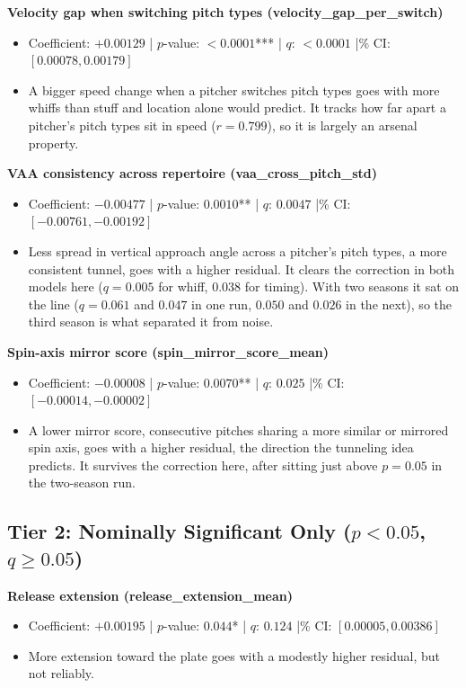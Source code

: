 \documentclass[11pt]{article}
\newcommand{\feat}[1]{\textbf{#1}}
\begin{document}
\feat{Velocity gap when switching pitch types (velocity\_gap\_per\_switch)}
\begin{itemize}
\item Coefficient: $+0.00129$ \;|\; $p$-value: $<0.0001$*** \;|\; $q$: $<0.0001$ \;|\% CI: $[0.00078, 0.00179]$
\item A bigger speed change when a pitcher switches pitch types goes with more whiffs than stuff and location alone would predict. It tracks how far apart a pitcher's pitch types sit in speed ($r=0.799$), so it is largely an arsenal property.
\end{itemize}

\feat{VAA consistency across repertoire (vaa\_cross\_pitch\_std)}
\begin{itemize}
\item Coefficient: $-0.00477$ \;|\; $p$-value: $0.0010$** \;|\; $q$: $0.0047$ \;|\% CI: $[-0.00761, -0.00192]$
\item Less spread in vertical approach angle across a pitcher's pitch types, a more consistent tunnel, goes with a higher residual. It clears the correction in both models here ($q=0.005$ for whiff, $0.038$ for timing). With two seasons it sat on the line ($q=0.061$ and $0.047$ in one run, $0.050$ and $0.026$ in the next), so the third season is what separated it from noise.
\end{itemize}

\feat{Spin-axis mirror score (spin\_mirror\_score\_mean)}
\begin{itemize}
\item Coefficient: $-0.00008$ \;|\; $p$-value: $0.0070$** \;|\; $q$: $0.025$ \;|\% CI: $[-0.00014, -0.00002]$
\item A lower mirror score, consecutive pitches sharing a more similar or mirrored spin axis, goes with a higher residual, the direction the tunneling idea predicts. It survives the correction here, after sitting just above $p=0.05$ in the two-season run.
\end{itemize}

\subsection*{Tier 2: Nominally Significant Only ($p<0.05$, $q\ge0.05$)}

\feat{Release extension (release\_extension\_mean)}
\begin{itemize}
\item Coefficient: $+0.00195$ \;|\; $p$-value: $0.044$* \;|\; $q$: $0.124$ \;|\% CI: $[0.00005, 0.00386]$
\item More extension toward the plate goes with a modestly higher residual, but not reliably.
\end{itemize}
\end{document}
